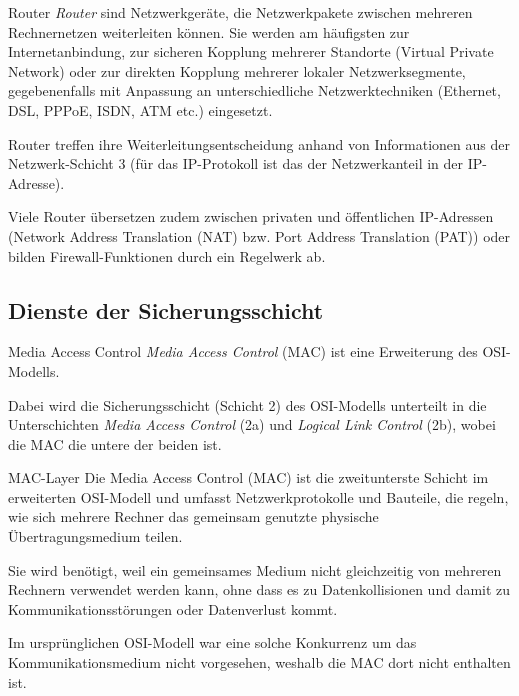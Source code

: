 \begin{defi}{Router}
    \emph{Router} sind Netzwerkgeräte, die Netzwerkpakete zwischen mehreren Rechnernetzen weiterleiten können.
    Sie werden am häufigsten zur Internetanbindung, zur sicheren Kopplung mehrerer Standorte (Virtual Private Network) oder zur direkten Kopplung mehrerer lokaler Netzwerksegmente, gegebenenfalls mit Anpassung an unterschiedliche Netzwerktechniken (Ethernet, DSL, PPPoE, ISDN, ATM etc.) eingesetzt.

    Router treffen ihre Weiterleitungsentscheidung anhand von Informationen aus der Netzwerk-Schicht 3 (für das IP-Protokoll ist das der Netzwerkanteil in der IP-Adresse).

    Viele Router übersetzen zudem zwischen privaten und öffentlichen IP-Adressen (Network Address Translation (NAT) bzw. Port Address Translation (PAT)) oder bilden Firewall-Funktionen durch ein Regelwerk ab.

\end{defi}

\subsection{Dienste der Sicherungsschicht}

\begin{defi}{Media Access Control}
    \emph{Media Access Control} (MAC) ist eine Erweiterung des OSI-Modells.

    Dabei wird die Sicherungsschicht (Schicht 2) des OSI-Modells unterteilt in die Unterschichten \emph{Media Access Control} (2a) und \emph{Logical Link Control} (2b), wobei die MAC die untere der beiden ist.
\end{defi}

\begin{defi}{MAC-Layer}
    Die Media Access Control (MAC) ist die zweitunterste Schicht im erweiterten OSI-Modell und umfasst Netzwerkprotokolle und Bauteile, die regeln, wie sich mehrere Rechner das gemeinsam genutzte physische Übertragungsmedium teilen.

    Sie wird benötigt, weil ein gemeinsames Medium nicht gleichzeitig von mehreren Rechnern verwendet werden kann, ohne dass es zu Datenkollisionen und damit zu Kommunikationsstörungen oder Datenverlust kommt.

    Im ursprünglichen OSI-Modell war eine solche Konkurrenz um das Kommunikationsmedium nicht vorgesehen, weshalb die MAC dort nicht enthalten ist.
\end{defi}

